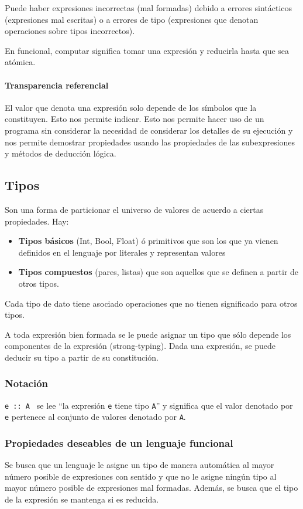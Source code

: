 \documentclass[10pt,a4paper]{article}
\begin{document}
Puede haber expresiones incorrectas (mal formadas) debido a errores sintácticos (expresiones mal escritas) o a errores de tipo (expresiones que denotan operaciones sobre tipos incorrectos).

En funcional, computar significa tomar una expresión y reducirla hasta que sea atómica.

\paragraph{Transparencia referencial} El valor que denota una expresión solo depende de los símbolos que la constituyen. Esto nos permite indicar. Esto nos permite hacer uso de un programa sin considerar la necesidad de considerar los detalles de su ejecución y nos permite demostrar propiedades usando las propiedades de las subexpresiones y métodos  de deducción lógica.

\subsection{Tipos}
Son una forma de particionar el universo de valores de acuerdo a ciertas propiedades. Hay:
\begin{itemize}
	\item \textbf{Tipos básicos} (Int, Bool, Float) ó primitivos que son los que ya vienen definidos en el lenguaje por literales y representan valores 
	\item \textbf{Tipos compuestos} (pares, listas) que son aquellos que se definen a partir de otros tipos.
\end{itemize}

Cada tipo de dato tiene asociado operaciones que no tienen significado para otros tipos.

A toda expresión bien formada se le puede asignar un tipo que sólo depende los componentes de la expresión (strong-typing). Dada una expresión, se puede deducir su tipo a partir de su constitución.

\subsubsection{Notación}  
\texttt{e :: A } se lee “la expresión \texttt{e} tiene tipo \texttt{A}” y significa que el valor denotado por \texttt{e} pertenece al conjunto de valores denotado por \texttt{A}.

\subsubsection{Propiedades deseables de un lenguaje funcional}
Se busca que un lenguaje le asigne un tipo de manera automática al mayor número posible de expresiones con sentido y que no le asigne ningún tipo al mayor número posible de expresiones mal formadas. Además, se busca que el tipo de la expresión se mantenga si es reducida.
\end{document}
